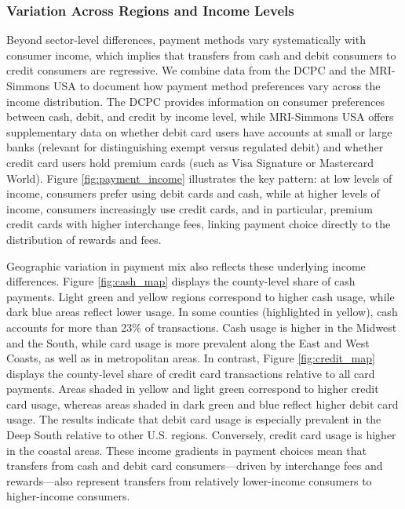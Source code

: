 \documentclass[11pt,english]{article}
\theoremstyle{remark}
\begin{document}
\subsubsection{Variation Across Regions and Income Levels}
\label{subsubsec:regional-income-variation}

Beyond sector-level differences, payment methods vary systematically with consumer income, which implies that transfers from cash and debit consumers to credit consumers are regressive.
We combine data from the DCPC and the MRI-Simmons USA to document how payment method preferences vary across the income distribution.
The DCPC provides information on consumer preferences between cash, debit, and credit by income level, while MRI-Simmons USA offers supplementary data on whether debit card users have accounts at small or large banks (relevant for distinguishing exempt versus regulated debit) and whether credit card users hold premium cards (such as Visa Signature or Mastercard World).
Figure \ref{fig:payment_income} illustrates the key pattern: at low levels of income, consumers prefer using debit cards and cash, while at higher levels of income, consumers increasingly use credit cards, and in particular, premium credit cards with higher interchange fees, linking payment choice directly to the distribution of rewards and fees.

Geographic variation in payment mix also reflects these underlying income differences.
Figure \ref{fig:cash_map} displays the county-level share of cash payments.
Light green and yellow regions correspond to higher cash usage, while dark blue areas reflect lower usage.
In some counties (highlighted in yellow), cash accounts for more than 23\% of transactions.
Cash usage is higher in the Midwest and the South, while card usage is more prevalent along the East and West Coasts, as well as in metropolitan areas. In contrast, Figure \ref{fig:credit_map} displays the county-level share of credit card transactions relative to all card payments.
Areas shaded in yellow and light green correspond to higher credit card usage, whereas areas shaded in dark green and blue reflect higher debit card usage.
The results indicate that debit card usage is especially prevalent in the Deep South relative to other U.S. regions.
Conversely, credit card usage is higher in the coastal areas.
These income gradients in payment choices mean that transfers from cash and debit card consumers---driven by interchange fees and rewards---also represent transfers from relatively lower-income consumers to higher-income consumers.
\end{document}
